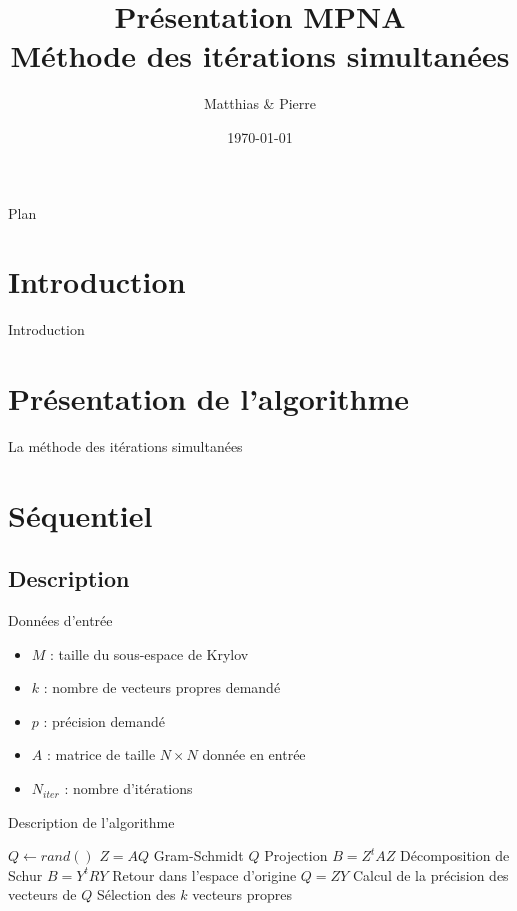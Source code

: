 \documentclass[9.5pt]{beamer}
\title[MPNA : MIS]{Présentation MPNA \\Méthode des itérations simultanées}
\author[\bsc{Beaupère} \& \bsc{Granger}]{Matthias \bsc{Beaupère} \& Pierre \bsc{Granger}}
\institute{M2 CHPS}
\date{\today}
\begin{document}

\begin{frame}
  \titlepage
\end{frame}

\begin{frame}{Plan}
	\tableofcontents[hideallsubsections]
\end{frame}

\section{Introduction}
	\begin{frame}{Introduction}

	\end{frame}

\section{Présentation de l'algorithme}
	\begin{frame}{La méthode des itérations simultanées}

	\end{frame}

\section{Séquentiel}
	\subsection{Description}
		\begin{frame}{Données d'entrée}
			\begin{itemize}
				\item $M$ : taille du sous-espace de Krylov
				\item $k$ : nombre de vecteurs propres demandé
				\item $p$ : précision demandé
				\item $A$ : matrice de taille $N\times N$ donnée en entrée
				\item $N_{iter}$ : nombre d'itérations
			\end{itemize}
		\end{frame}
		\begin{frame}{Description de l'algorithme}
			\begin{algorithmic}
				\State $Q \gets rand()$
					\State $Z = AQ$
					\State Gram-Schmidt $Q$
					\State Projection $B = Z^tAZ$
					\State Décomposition de Schur $B = Y^tRY$
					\State Retour dans l'espace d'origine $Q = ZY$
					\State Calcul de la précision des vecteurs de $Q$
					\State Sélection des $k$ vecteurs propres
				\EndWhile
			\end{algorithmic}
		\end{frame}
\end{document}
